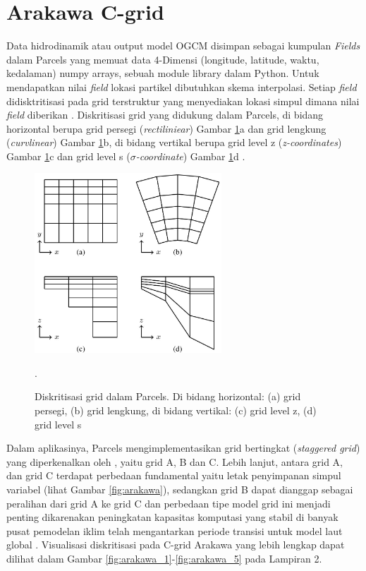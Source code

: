 \section[Arakawa C-grid]{Arakawa C-grid}
\begin{spacing}{1.5}
	\justifying
	Data hidrodinamik atau output model OGCM disimpan sebagai kumpulan \textit{Fields} dalam Parcels yang memuat data 4-Dimensi (longitude, latitude, waktu, kedalaman) numpy arrays, sebuah module library dalam Python. Untuk mendapatkan nilai \textit{field} lokasi partikel dibutuhkan skema interpolasi. Setiap \textit{field} didisktritisasi pada grid terstruktur yang menyediakan lokasi simpul dimana nilai \textit{field} diberikan . Diskritisasi grid yang didukung dalam Parcels, di bidang horizontal berupa grid persegi (\textit{rectiliniear}) Gambar \ref{fig:grid}a dan grid lengkung (\textit{curvlinear}) Gambar \ref{fig:grid}b, di bidang vertikal berupa grid level z (\textit{z-coordinates}) Gambar \ref{fig:grid}c dan grid level s (\textit{$\sigma$-coordinate}) Gambar \ref{fig:grid}d .
	
	\begin{figure}[H]
		\centering
		\includegraphics[width=7cm]{contents/grid.jpg}
		\caption{Diskritisasi grid dalam Parcels. Di bidang horizontal: (a) grid persegi, (b) grid lengkung, di bidang vertikal: (c) grid level z, (d) grid level s \protect{}}.
		\label{fig:grid}
	\end{figure}
	
	Dalam aplikasinya, Parcels mengimplementasikan grid bertingkat (\textit{staggered grid}) yang diperkenalkan oleh , yaitu grid A, B dan C. Lebih lanjut, antara grid A, dan grid C terdapat perbedaan fundamental yaitu letak penyimpanan simpul variabel (lihat Gambar \ref{fig:arakawa}), sedangkan grid B dapat dianggap sebagai peralihan dari grid A ke grid C dan perbedaan tipe model grid ini menjadi penting dikarenakan peningkatan kapasitas komputasi yang stabil di banyak pusat pemodelan iklim telah mengantarkan periode transisi untuk model laut global  . Visualisasi diskritisasi pada C-grid Arakawa yang lebih lengkap dapat dilihat dalam Gambar \ref{fig:arakawa_1}-\ref{fig:arakawa_5} pada Lampiran 2.
	

\end{spacing}
